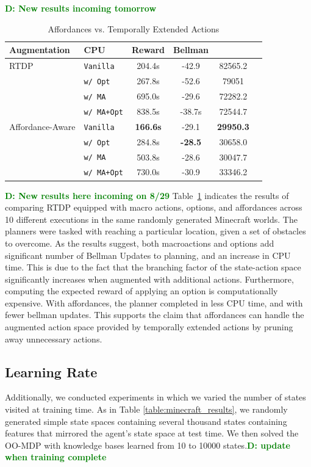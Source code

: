 \documentclass[conference]{IEEEtran}
\newcommand{\dnote}[1]{\textcolor{Green}{\textbf{D: #1}}}
\begin{document}
\dnote{New results incoming tomorrow}
\begin{table}[H]
\centering
\caption{Affordances vs. Temporally Extended Actions}
\begin{tabular}{ l l  || c c c c}
  Augmentation 					&	CPU	&	Reward 	& Bellman \\ \hline
RTDP &  \texttt{Vanilla}  					&	204.4s&	-42.9		&	82565.2		\\
 & \texttt{w/ Opt}  				&	267.8s	&	-52.6		&	79051		\\
 &\texttt{w/ MA}  					&	695.0s	&	-29.6		&	72282.2		\\
 &\texttt{w/ MA+Opt}  			&	838.5s&	-38.7s	&	72544.7		\\ \hline
 Affordance-Aware &\texttt{Vanilla}  			& 	{\bf 166.6s}&	-29.1		&	{\bf 29950.3}		\\
  &\texttt{w/ Opt}  		& 	284.8s&	{\bf -28.5}		&	30658.0		\\
  &\texttt{w/ MA}  		& 	503.8s&	-28.6		&	30047.7		\\
  &\texttt{w/ MA+Opt}  	& 	730.0s&	-30.9		&	33346.2		\\
\end{tabular}
\label{table:temp_ext_act_results}
\end{table}

\dnote{New results here incoming on 8/29}
Table~\ref{table:temp_ext_act_results} indicates the results of comparing RTDP
equipped with macro actions, options, and affordances across 10 different executions
in the same randomly generated Minecraft worlds. The planners were tasked with 
reaching a particular location, given a set of obstacles to overcome. As the results 
suggest, both macroactions and options add significant number of Bellman Updates to 
planning, and an increase in CPU time. This is due to the fact that the branching factor of the state-action space significantly increases when augmented with additional actions. Furthermore, computing the expected reward of applying an option is computationally expensive. With affordances, the planner completed in less CPU time, and with fewer 
bellman updates. This supports the claim that affordances can handle the augmented 
action space provided by temporally extended actions by pruning away unnecessary actions.

\subsection{Learning Rate}
Additionally, we conducted experiments in which we varied the number of states visited at training time. 
As in Table \ref{table:minecraft_results}, we randomly generated simple state spaces
containing several thousand states containing features that mirrored the agent's state
space at test time. We then solved the OO-MDP with knowledge bases learned from 
10 to 10000 states.\dnote{update when training complete}
\end{document}
